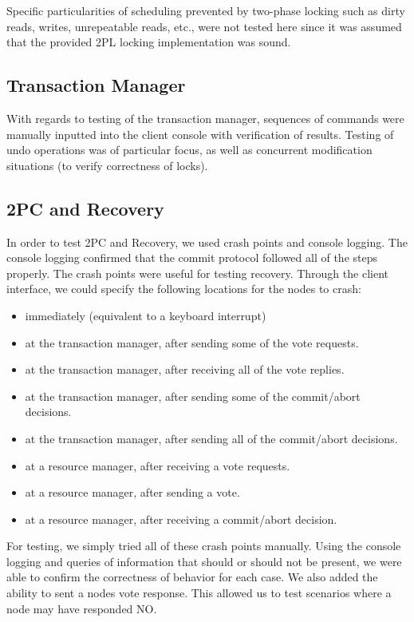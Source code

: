 \documentclass[11pt]{article}
\begin{document}
Specific particularities of scheduling prevented by two-phase locking such as dirty reads, writes, unrepeatable reads, etc., were not tested here since it was assumed that the provided 2PL locking implementation was sound. \par

\subsection*{Transaction Manager}

With regards to testing of the transaction manager, sequences of commands were manually inputted into the client console with verification of results. Testing of undo operations was of particular focus, as well as concurrent modification situations (to verify correctness of locks).\par

\subsection*{2PC and Recovery}

In order to test 2PC and Recovery, we used crash points and console logging. The console logging confirmed that the commit protocol followed all of the steps properly. The crash points were useful for testing recovery. Through the client interface, we could specify the following locations for the nodes to crash:
\begin{itemize}
\item immediately (equivalent to a keyboard interrupt)
\item at the transaction manager, after sending some of the vote requests.
\item at the transaction manager, after receiving all of the vote replies.
\item at the transaction manager, after sending some of the commit/abort decisions.
\item at the transaction manager, after sending all of the commit/abort decisions.
\item at a resource manager, after receiving a vote requests.
\item at a resource manager, after sending a vote.
\item at a resource manager, after receiving a commit/abort decision.
\end{itemize}
For testing, we simply tried all of these crash points manually. Using the console logging and queries of information that should or should not be present, we were able to confirm the correctness of behavior for each case. We also added the ability to sent a nodes vote response. This allowed us to test scenarios where a node may have responded NO.\par
\end{document}
